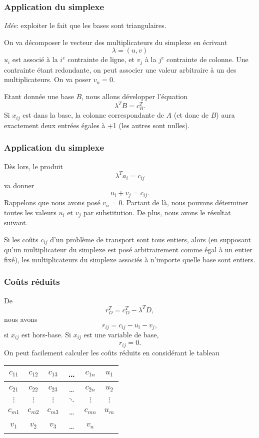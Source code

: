 \documentclass[usepdftitle=false]{beamer}
\begin{document}
\begin{frame}
\frametitle{Application du simplexe}

{\sl Idée}: exploiter le fait que les bases sont triangulaires.

\mbox{}

On va décomposer le vecteur des multiplicateurs du simplexe en écrivant
\[
\lambda = (u,v)
\]
$u_i$ est associé à la $i^e$ contrainte de ligne, et $v_j$ à la $j^e$ contrainte de colonne. Une contrainte étant redondante, on peut associer une valeur arbitraire à un des multiplicateurs. On va poser $v_n = 0$.

\mbox{}

Etant donnée une base $B$, nous allons développer l'équation
\[
\lambda^T B = c_B^T.
\]
Si $x_{ij}$ est dans la base, la colonne correspondante de $A$ (et donc de $B$) aura exactement deux entrées égales à +1 (les autres sont nulles).

\end{frame}

\begin{frame}
\frametitle{Application du simplexe}

Dès lors, le produit
\[
\lambda^T a_i = c_{ij}
\]
va donner
\[
u_i + v_j = c_{ij}.
\]
Rappelons que nous avons posé $v_n = 0$. Partant de là, nous pouvons déterminer toutes les valeurs $u_i$ et $v_j$ par substitution. De plus, nous avons le résultat suivant.

\begin{mltheorem}
Si les coûts $c_{ij}$ d'un problème de transport sont tous entiers, alors (en supposant qu'un multiplicateur du simplexe est posé arbitrairement comme égal à un entier fixé), les multiplicateurs du simplexe associés à n'importe quelle base sont entiers.
\end{mltheorem}

\end{frame}

\begin{frame}
\frametitle{Coûts réduits}

De
\[
r_D^T = c_D^T - \lambda^T D,
\]
nous avons
\[
r_{ij} = c_{ij} - u_i - v_j,
\]
si $x_{ij}$ est hors-base. Si $x_{ij}$ est une variable de base,
\[
r_{ij} = 0.
\]
On peut facilement calculer les coûts réduits en considérant le tableau
\begin{center}
\begin{tabular}{|c|c|c|c|c|c|}
\hline
$c_{11}$ & $c_{12}$ & $c_{13}$ & \ldots & $c_{1n}$ & $u_1$ \\
\hline
$c_{21}$ & $c_{22}$ & $c_{23}$ & \ldots & $c_{2n}$ & $u_2$ \\
\hline
$\vdots$ & $\vdots$ & $\vdots$ & $\ddots$ & $\vdots$ & $\vdots$ \\
\hline
$c_{m1}$ & $c_{m2}$ & $c_{m3}$ & \ldots & $c_{mn}$ & $u_m$ \\
\hline
$v_1$ & $v_2$ & $v_3$ & \ldots & $v_n$ & \\
\hline
\end{tabular}
\end{center}

\end{frame}
\end{document}
